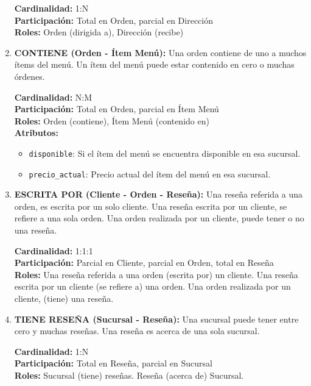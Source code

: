 \begin{enumerate}
    \textbf{Cardinalidad:} 1:N \\
    \textbf{Participación:} Total en Orden, parcial en Dirección \\
    \textbf{Roles:} Orden (dirigida a), Dirección (recibe)
    
    \item \textbf{CONTIENE (Orden - Ítem Menú):} Una orden contiene de uno a muchos ítems del menú. Un ítem del menú puede estar contenido en cero o muchas órdenes.

    \textbf{Cardinalidad:} N:M \\
    \textbf{Participación:} Total en Orden, parcial en Ítem Menú \\
    \textbf{Roles:} Orden (contiene), Ítem Menú (contenido en) \\
    \textbf{Atributos:}
    \begin{itemize}
        \item \texttt{disponible}: Si el ítem del menú se encuentra disponible en esa sucursal.
        \item \texttt{precio\_actual}: Precio actual del ítem del menú en esa sucursal.
    \end{itemize}

    \item \textbf{ESCRITA POR (Cliente - Orden - Reseña):} Una reseña referida a una orden, es escrita por un solo cliente. Una reseña escrita por un cliente, se refiere a una sola orden. Una orden realizada por un cliente, puede tener o no una reseña.

    \textbf{Cardinalidad:} 1:1:1 \\
    \textbf{Participación:} Parcial en Cliente, parcial en Orden, total en Reseña \\
    \textbf{Roles:} Una reseña referida a una orden (escrita por) un cliente. Una reseña escrita por un cliente (se refiere a) una orden. Una orden realizada por un cliente, (tiene) una reseña.

    \item \textbf{TIENE RESEÑA (Sucursal - Reseña):} Una sucursal puede tener entre cero y muchas reseñas. Una reseña es acerca de una sola sucursal.

    \textbf{Cardinalidad:} 1:N \\
    \textbf{Participación:} Total en Reseña, parcial en Sucursal \\
    \textbf{Roles:} Sucursal (tiene) reseñas. Reseña (acerca de) Sucursal.
\end{enumerate}

